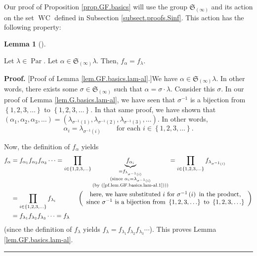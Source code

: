 \documentclass[numbers=enddot,12pt,final,onecolumn,notitlepage]{scrartcl}%
\theoremstyle{definition}
\newtheorem{lem}[theo]{Lemma}
\newenvironment{lemma}[1][]
{\begin{lem}[#1]\begin{leftbar}}
{\end{leftbar}\end{lem}}
\newenvironment{proof}[1][Proof]{\noindent\textbf{#1.} }{\ \rule{0.5em}{0.5em}}
\let\prodnonlimits\prod
\renewcommand{\prod}{\prodnonlimits\limits}
\newenvironment{verlong}{}{}
\begin{document}
\begin{verlong}
Our proof of Proposition \ref{prop.GF.basics} will use the group
$\mathfrak{S}_{\left(  \infty\right)  }$ and its action on the set
$\operatorname*{WC}$ defined in Subsection \ref{subsect.proofs.Sinf}. This
action has the following property:

\begin{lemma}
\label{lem.GF.basics.lam-al}Let $\lambda\in\operatorname*{Par}$. Let
$\alpha\in\mathfrak{S}_{\left(  \infty\right)  }\lambda$. Then, $f_{\alpha
}=f_{\lambda}$.
\end{lemma}

\begin{proof}
[Proof of Lemma \ref{lem.GF.basics.lam-al}.]We have $\alpha\in\mathfrak{S}%
_{\left(  \infty\right)  }\lambda$. In other words, there exists some
$\sigma\in\mathfrak{S}_{\left(  \infty\right)  }$ such that $\alpha
=\sigma\cdot\lambda$. Consider this $\sigma$. In our proof of Lemma
\ref{lem.G.basics.lam-al}, we have seen that $\sigma^{-1}$ is a bijection from
$\left\{  1,2,3,\ldots\right\}  $ to $\left\{  1,2,3,\ldots\right\}  $. In
that same proof, we have shown that $\left(  \alpha_{1},\alpha_{2},\alpha
_{3},\ldots\right)  =\left(  \lambda_{\sigma^{-1}\left(  1\right)  }%
,\lambda_{\sigma^{-1}\left(  2\right)  },\lambda_{\sigma^{-1}\left(  3\right)
},\ldots\right)  $. In other words,
\begin{equation}
\alpha_{i}=\lambda_{\sigma^{-1}\left(  i\right)  }%
\ \ \ \ \ \ \ \ \ \ \text{for each }i\in\left\{  1,2,3,\ldots\right\}  .
\label{pf.lem.GF.basics.lam-al.1}%
\end{equation}


Now, the definition of $f_{\alpha}$ yields%
\begin{align*}
f_{\alpha}  &  =f_{\alpha_{1}}f_{\alpha_{2}}f_{\alpha_{3}}\cdots=\prod
_{i\in\left\{  1,2,3,\ldots\right\}  }\underbrace{f_{\alpha_{i}}%
}_{\substack{=f_{\lambda_{\sigma^{-1}\left(  i\right)  }}\\\text{(since
}\alpha_{i}=\lambda_{\sigma^{-1}\left(  i\right)  }\\\text{(by
(\ref{pf.lem.GF.basics.lam-al.1})))}}}=\prod_{i\in\left\{  1,2,3,\ldots
\right\}  }f_{\lambda_{\sigma^{-1}\left(  i\right)  }}\\
&  =\prod_{i\in\left\{  1,2,3,\ldots\right\}  }f_{\lambda_{i}}%
\ \ \ \ \ \ \ \ \ \ \left(
\begin{array}
[c]{c}%
\text{here, we have substituted }i\text{ for }\sigma^{-1}\left(  i\right)
\text{ in the product,}\\
\text{since }\sigma^{-1}\text{ is a bijection from }\left\{  1,2,3,\ldots
\right\}  \text{ to }\left\{  1,2,3,\ldots\right\}
\end{array}
\right) \\
&  =f_{\lambda_{1}}f_{\lambda_{2}}f_{\lambda_{3}}\cdots=f_{\lambda}%
\end{align*}
(since the definition of $f_{\lambda}$ yields $f_{\lambda}=f_{\lambda_{1}%
}f_{\lambda_{2}}f_{\lambda_{3}}\cdots$). This proves Lemma
\ref{lem.GF.basics.lam-al}.
\end{proof}


\end{verlong}
\end{document}
